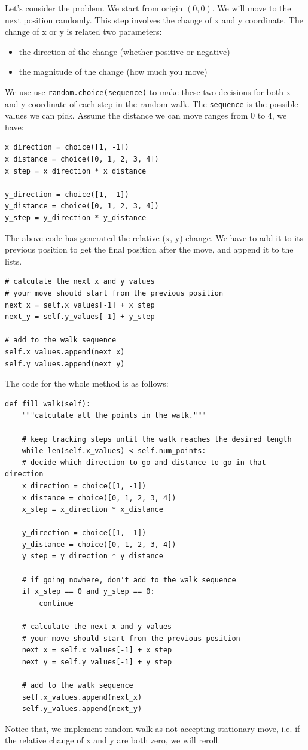 \documentclass[12pt]{book}
\begin{document}
Let's consider the problem. We start from origin \((0,0)\). We will move to the next position randomly. This step involves the change of x and y coordinate. The change of x or y is related two parameters:
\begin{itemize}
\item the direction of the change (whether positive or negative)
\item the magnitude of the change (how much you move)
\end{itemize}
We use use \texttt{random.choice(sequence)} to make these two decisions for both x and y coordinate of each step in the random walk. The \texttt{sequence} is the possible values we can pick. Assume the distance we can move ranges from 0 to 4, we have:
\begin{verbatim}
x_direction = choice([1, -1])
x_distance = choice([0, 1, 2, 3, 4])
x_step = x_direction * x_distance

y_direction = choice([1, -1])
y_distance = choice([0, 1, 2, 3, 4])
y_step = y_direction * y_distance
\end{verbatim}
The above code has generated the relative (x, y) change. We have to add it to its previous position to get the final position after the move, and append it to the lists.
\begin{verbatim}
# calculate the next x and y values
# your move should start from the previous position
next_x = self.x_values[-1] + x_step
next_y = self.y_values[-1] + y_step

# add to the walk sequence
self.x_values.append(next_x)
self.y_values.append(next_y)
\end{verbatim}

The code for the whole method is as follows:
\begin{verbatim}
def fill_walk(self):
    """calculate all the points in the walk."""

    # keep tracking steps until the walk reaches the desired length
    while len(self.x_values) < self.num_points:
	# decide which direction to go and distance to go in that direction
	x_direction = choice([1, -1])
	x_distance = choice([0, 1, 2, 3, 4])
	x_step = x_direction * x_distance

	y_direction = choice([1, -1])
	y_distance = choice([0, 1, 2, 3, 4])
	y_step = y_direction * y_distance

	# if going nowhere, don't add to the walk sequence
	if x_step == 0 and y_step == 0:
	    continue

	# calculate the next x and y values
	# your move should start from the previous position
	next_x = self.x_values[-1] + x_step
	next_y = self.y_values[-1] + y_step

	# add to the walk sequence
	self.x_values.append(next_x)
	self.y_values.append(next_y)
\end{verbatim}
Notice that, we implement random walk as not accepting stationary move, i.e. if the relative change of x and y are both zero, we will reroll.
\end{document}
